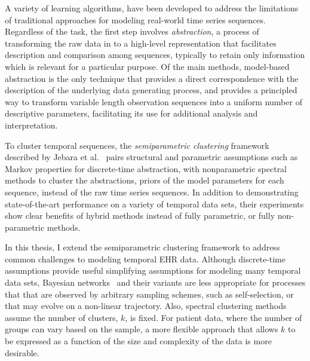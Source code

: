 
 A variety of learning algorithms, have been developed to address the limitations of traditional approaches for modeling real-world time series sequences.  Regardless of the task, the first step involves \emph{abstraction}, a process of transforming the raw data in to a high-level representation that facilitates description and comparison among sequences, typically to retain only information which is relevant for a particular purpose.  Of the main methods, model-based abstraction is the only technique that provides a direct correspondence with the description of the underlying data generating process, and provides a principled way to transform variable length observation sequences into a uniform number of descriptive parameters, facilitating its use for additional analysis and interpretation.

To cluster temporal sequences, the \emph{semiparametric clustering} framework described by Jebara et al.~\cite{Jebara} pairs structural and parametric assumptions such as Markov properties for discrete-time abstraction, with nonparametric spectral methods to cluster the abstractions, priors of the model parameters for each sequence, instead of the raw time series sequences.  In addition to demonstrating state-of-the-art performance on a variety of temporal data sets, their experiments show clear benefits of hybrid methods instead of fully parametric, or fully non-parametric methods.

In this thesis, I extend the semiparametric clustering framework to address common challenges to modeling temporal EHR data.  Although discrete-time assumptions provide useful simplifying assumptions for modeling many temporal data sets, Bayesian networks~\cite{Dean89} and their variants are less appropriate for processes that that are observed by arbitrary sampling schemes, such as self-selection, or that may evolve on a non-linear trajectory.  Also, spectral clustering methods assume the number of clusters, $k$, is fixed.  For patient data, where the number of groups can vary based on the sample, a more flexible approach that allows $k$ to be expressed as a function of the size and complexity of the data is more desirable.

